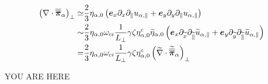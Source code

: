 %
\begin{align}
 \left(\nabla\cdot\boldsymbol{\overline{\overline{\pi}}}_\alpha\right)_\perp \simeq&
 \frac{2}{3}\eta_{\alpha,0}
 \left(
  \boldsymbol{e}_x\partial_x\partial_\|u_{\alpha,\|}
  +
  \boldsymbol{e}_y\partial_y\partial_\|u_{\alpha,\|}
 \right)
 \\
 \sim&
 \frac{2}{3}\eta_{\alpha,0}
  \omega_{ci}
  \frac{1}{L_\perp}
  \gamma
  \zeta
  \eta^c_{\alpha,0}
  \widetilde{ \eta}_{\alpha,0}
 \left(
  \boldsymbol{e}_x\partial_{\widetilde{ x}}\partial_{\widetilde{ \|}}\widetilde{ u}_{\alpha,\|} +
  \boldsymbol{e}_y\partial_{\widetilde{ y}}\partial_{\widetilde{ \|}}\widetilde{ u}_{\alpha,\|}
 \right)
 \\
 =&
 \frac{2}{3}\eta_{\alpha,0}
  \omega_{ci}
  \frac{1}{L_\perp}
  \gamma
  \zeta
  \eta^c_{\alpha,0}
 \left(\widetilde{ \nabla}\cdot\widetilde{ \boldsymbol{\overline{\overline{\pi}}}}_\alpha\right)_\perp
\end{align}
%

YOU ARE HERE





















